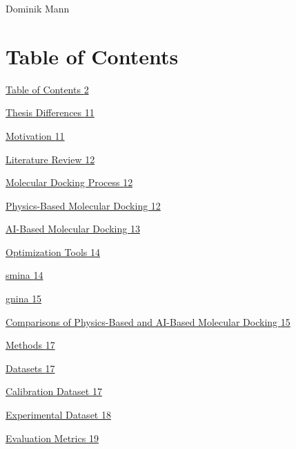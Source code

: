 Dominik Mann

\hypertarget{table-of-contents}{%
\chapter{\texorpdfstring{\hfill\break
Table of Contents}{ Table of Contents}}\label{table-of-contents}}

\protect\hyperlink{_Toc235735872}{Table of Contents \protect\hyperlink{_Toc235735872}{2}}

\protect\hyperlink{_Toc235735873}{Thesis Differences \protect\hyperlink{_Toc235735873}{11}}

\protect\hyperlink{motivation}{Motivation \protect\hyperlink{motivation}{11}}

\protect\hyperlink{literature-review}{Literature Review \protect\hyperlink{literature-review}{12}}

\protect\hyperlink{molecular-docking-process}{Molecular Docking Process \protect\hyperlink{molecular-docking-process}{12}}

\protect\hyperlink{physics-based-molecular-docking}{Physics-Based Molecular Docking \protect\hyperlink{physics-based-molecular-docking}{12}}

\protect\hyperlink{ai-based-molecular-docking}{AI-Based Molecular Docking \protect\hyperlink{ai-based-molecular-docking}{13}}

\protect\hyperlink{optimization-tools}{Optimization Tools \protect\hyperlink{optimization-tools}{14}}

\protect\hyperlink{smina}{smina \protect\hyperlink{smina}{14}}

\protect\hyperlink{gnina}{gnina \protect\hyperlink{gnina}{15}}

\protect\hyperlink{comparisons-of-physics-based-and-ai-based-molecular-docking}{Comparisons of Physics-Based and AI-Based Molecular Docking \protect\hyperlink{comparisons-of-physics-based-and-ai-based-molecular-docking}{15}}

\protect\hyperlink{methods}{Methods \protect\hyperlink{methods}{17}}

\protect\hyperlink{datasets}{Datasets \protect\hyperlink{datasets}{17}}

\protect\hyperlink{_Toc235735885}{Calibration Dataset \protect\hyperlink{_Toc235735885}{17}}

\protect\hyperlink{experimental-dataset}{Experimental Dataset \protect\hyperlink{experimental-dataset}{18}}

\protect\hyperlink{evaluation-metrics}{Evaluation Metrics \protect\hyperlink{evaluation-metrics}{19}}

